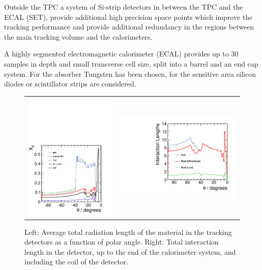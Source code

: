Outside the TPC a system of Si-strip detectors in between the TPC and the ECAL (SET), provide additional high precision space points which improve the tracking performance and provide additional
    redundancy in the regions between the main tracking volume and the calorimeters. 

A highly segmented electromagnetic calorimeter (ECAL) provides up to 30 samples in depth and small transverse cell size, split into a barrel and an end cap system. For the absorber Tungsten has been chosen, for the sensitive area silicon diodes or scintillator strips are considered.
\begin{figure}[t!]
\begin{tabular}{cc}
\includegraphics[width=0.52\hsize,viewport={0 -10 600 500},clip]{figures/material-budget-new.pdf} &
\includegraphics[width=0.5\hsize]{figures/intlen_ILD_o1_v05.pdf}
\end{tabular}
\caption[Material in the ILD detector]{Left: Average total radiation length of the material
  in the tracking detectors as a function of polar angle. Right: Total interaction length in the detector, up to the end of the calorimeter system, and including the coil of the detector.}
\label{fig:intro:material}

\end{figure}

